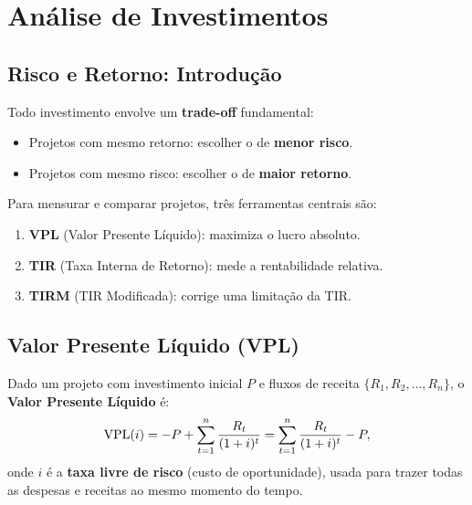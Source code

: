 
\chapter{Análise de Investimentos}

\section{Risco e Retorno: Introdução}

Todo investimento envolve um \textbf{trade-off} fundamental:
\begin{itemize}
  \item Projetos com mesmo retorno: escolher o de \textbf{menor risco}.
  \item Projetos com mesmo risco: escolher o de \textbf{maior retorno}.
\end{itemize}

Para mensurar e comparar projetos, três ferramentas centrais são:
\begin{enumerate}[label=\textbf{\arabic*.}]
  \item \textbf{VPL} (Valor Presente Líquido): maximiza o lucro absoluto.
  \item \textbf{TIR} (Taxa Interna de Retorno): mede a rentabilidade relativa.
  \item \textbf{TIRM} (TIR Modificada): corrige uma limitação da TIR.
\end{enumerate}

\section{Valor Presente Líquido (VPL)}

\begin{definicao}
Dado um projeto com investimento inicial $P$ e fluxos de receita $\{R_1, R_2, \ldots, R_n\}$,
o \textbf{Valor Presente Líquido} é:
\[
  \mathrm{VPL}(i) = -P + \sum_{t=1}^n \frac{R_t}{(1+i)^t}
           = \sum_{t=1}^n \frac{R_t}{(1+i)^t} - P,
\]
onde $i$ é a \textbf{taxa livre de risco} (custo de oportunidade), usada para trazer
todas as despesas e receitas ao mesmo momento do tempo.
\end{definicao}

